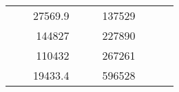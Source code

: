 \begin{table}[]
\begin{tabular}{|ccrccrccr}
\multicolumn{1}{|c|}{\cellcolor[HTML]{FFFFC7}}                                & \multicolumn{1}{c|}{\cellcolor[HTML]{DDFDFF}}                      & \multicolumn{1}{r|}{\cellcolor[HTML]{DAE8FC}27569.9}   & \multicolumn{1}{c|}{\cellcolor[HTML]{FFFFC7}}                                & \multicolumn{1}{c|}{\cellcolor[HTML]{DDFDFF}}                       & \multicolumn{1}{r|}{\cellcolor[HTML]{DDFDFF}137529}    &                                                                              &                                                                    &                                                        \\ \cline{3-3} \cline{6-6}
\multicolumn{1}{|c|}{\cellcolor[HTML]{FFFFC7}}                                & \multicolumn{1}{c|}{\cellcolor[HTML]{DDFDFF}}                      & \multicolumn{1}{r|}{\cellcolor[HTML]{DDFDFF}144827}    & \multicolumn{1}{c|}{\cellcolor[HTML]{FFFFC7}}                                & \multicolumn{1}{c|}{\cellcolor[HTML]{DDFDFF}}                       & \multicolumn{1}{r|}{\cellcolor[HTML]{DAE8FC}227890}    &                                                                              &                                                                    &                                                        \\ \cline{3-3} \cline{6-6}
\multicolumn{1}{|c|}{\cellcolor[HTML]{FFFFC7}}                                & \multicolumn{1}{c|}{\cellcolor[HTML]{DDFDFF}}                      & \multicolumn{1}{r|}{\cellcolor[HTML]{DAE8FC}110432}    & \multicolumn{1}{c|}{\cellcolor[HTML]{FFFFC7}}                                & \multicolumn{1}{c|}{\cellcolor[HTML]{DDFDFF}}                       & \multicolumn{1}{r|}{\cellcolor[HTML]{DDFDFF}267261}    &                                                                              &                                                                    &                                                        \\ \cline{3-3} \cline{6-6}
\multicolumn{1}{|c|}{\cellcolor[HTML]{FFFFC7}}                                & \multicolumn{1}{c|}{\cellcolor[HTML]{DDFDFF}}                      & \multicolumn{1}{r|}{\cellcolor[HTML]{DDFDFF}19433.4}   & \multicolumn{1}{c|}{\cellcolor[HTML]{FFFFC7}}                                & \multicolumn{1}{c|}{\cellcolor[HTML]{DDFDFF}}                       & \multicolumn{1}{r|}{\cellcolor[HTML]{DAE8FC}596528}    &                                                                              &                                                                    &                                                        \\ \cline{3-3} \cline{6-6}

\end{tabular}
\end{table}

